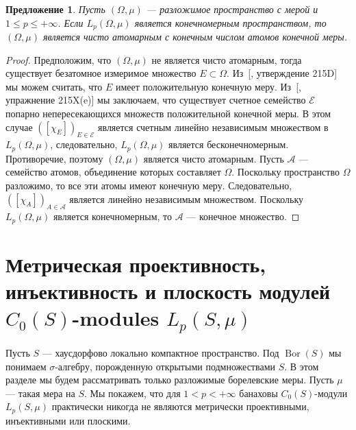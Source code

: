 \documentclass[12pt]{article}
\newtheorem{proposition}[theorem]{Предложение}
\begin{document}
\begin{proposition}\label{LpFinDimCharac}
    Пусть $(\Omega,\mu)$ --- разложимое пространство с мерой 
    и $1\leq p\leq+\infty$. Если $L_p(\Omega,\mu)$ является конечномерным 
    пространством, то $(\Omega,\mu)$ является чисто атомарным с конечным числом 
    атомов конечной меры.
\end{proposition} 
\begin{proof}
    Предположим, что $(\Omega,\mu)$ не является чисто атомарным, тогда 
    существует безатомное измеримое множество $E\subset \Omega$. 
    Из~[\cite{FremMeasTh2}, утверждение 215D] мы можем считать, что $E$ имеет 
    положительную конечную меру. Из~[\cite{FremMeasTh2}, упражнение 215X(e)] мы 
    заключаем, что существует счетное семейство $\mathcal{E}$ попарно 
    непересекающихся множеств положительной конечной меры. В этом 
    случае $([\chi_{E}])_{E\in\mathcal{E}}$ является счетным линейно независимым 
    множеством в $L_p(\Omega,\mu)$, следовательно, $L_p(\Omega,\mu)$ является 
    бесконечномерным. Противоречие, поэтому $(\Omega,\mu)$ является чисто 
    атомарным. Пусть $\mathcal{A}$ --- семейство атомов, объединение которых 
    составляет $\Omega$. Поскольку пространство $\Omega$ разложимо, то все эти 
    атомы имеют конечную меру. Следовательно, $([\chi_{A}])_{A\in\mathcal{A}}$ 
    является линейно независимым множеством. Поскольку $L_p(\Omega,\mu)$ 
    является конечномерным, то $\mathcal{A}$ --- конечное множество.
\end{proof}


\section{Метрическая проективность, инъективность и плоскость модулей 
\texorpdfstring{$C_0(S)$}{C0(S)}-modules 
\texorpdfstring{$L_p(S,\mu)$}{LpSmu}}
\label{MetrProInjFltOfC0SModLp}

Пусть $S$ --- хаусдорфово локально компактное пространство. 
Под $\operatorname{Bor}(S)$ мы понимаем $\sigma$-алгебру, порожденную открытыми 
подмножествами $S$. В этом разделе мы будем рассматривать только разложимые 
борелевские меры. Пусть $\mu$ --- такая мера на $S$. Мы покажем, что 
для $1<p<+\infty$ банаховы $C_0(S)$-модули $L_p(S,\mu)$ практически никогда не 
являются метрически проективными, инъективными или плоскими. 
\end{document}
